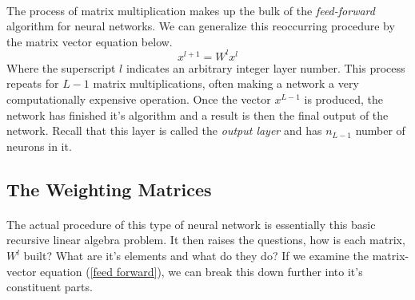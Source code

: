 \documentclass[12pt,letterpaper]{article}
\begin{document}
\paragraph*{}The process of matrix multiplication makes up the bulk of the \textit{feed-forward} algorithm for neural networks. We can generalize this reoccurring procedure by the matrix vector equation below.
\begin{equation}
\label{feed forward}
x^{l+1} = W^l x^l
\end{equation}
Where the superscript $l$ indicates an arbitrary integer layer number. This process repeats for $L-1$ matrix multiplications, often making a network a very computationally expensive operation. Once the vector $x^{L-1}$ is produced, the network has finished it's algorithm and a result is then the final output of the network. Recall that this layer is called the \textit{output layer} and has $n_{L-1}$ number of neurons in it. 


\subsection{The Weighting Matrices}
\paragraph*{}The actual procedure of this type of neural network is essentially this basic recursive linear algebra problem. It then raises the questions, how is each matrix, $W^l$ built? What are it's elements and what do they do? If we examine the matrix-vector equation (\ref{feed forward}), we can break this down further into it's constituent parts.
\end{document}
